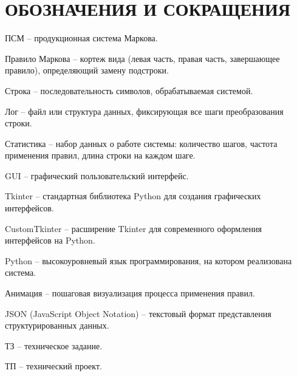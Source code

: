 \section*{ОБОЗНАЧЕНИЯ И СОКРАЩЕНИЯ}

ПСМ -- продукционная система Маркова.

Правило Маркова -- кортеж вида (левая часть, правая часть, завершающее правило), определяющий замену подстроки.

Строка -- последовательность символов, обрабатываемая системой.

Лог -- файл или структура данных, фиксирующая все шаги преобразования строки.

Статистика -- набор данных о работе системы: количество шагов, частота применения правил, длина строки на каждом шаге.

GUI -- графический пользовательский интерфейс.

Tkinter -- стандартная библиотека Python для создания графических интерфейсов.

CustomTkinter -- расширение Tkinter для современного оформления интерфейсов на Python.

Python -- высокоуровневый язык программирования, на котором реализована система.

Анимация -- пошаговая визуализация процесса применения правил.

JSON (JavaScript Object Notation) -- текстовый формат представления структурированных данных.

ТЗ -- техническое задание.

ТП -- технический проект.